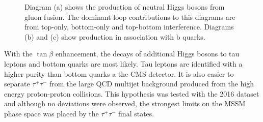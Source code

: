 \begin{figure}[H]
\begin{subfigure}[b]{0.3\textwidth}
\caption{}
\end{subfigure}
\hspace{2cm}
\begin{subfigure}[b]{0.3\textwidth}
\caption{}
\end{subfigure}
\caption{Diagram (a) shows the production of neutral Higgs bosons from gluon fusion. The dominant loop contributions to this diagrams are from top-only, bottom-only and top-bottom interference. Diagrams (b) and (c) show production in association with b quarks.}
\label{fig:mssm_feynamn}
\end{figure}

With the $\tan\beta$ enhancement, the decays of additional Higgs bosons to tau leptons and bottom quarks are most likely.
Tau leptons are identified with a higher purity than bottom quarks a the CMS detector.
It is also easier to separate $\tau^{+}\tau^{-}$ from the large QCD multijet background produced from the high energy proton-proton collisions.
This hypothesis was tested with the 2016 dataset and although no deviations were observed, the strongest limits on the MSSM phase space was placed by the $\tau^+\tau^-$ final states.

